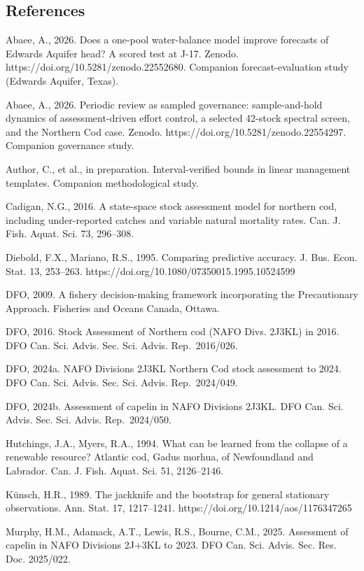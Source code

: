 \documentclass[11pt]{article}
\begin{document}
\subsection{References}\label{references}

Abaee, A., 2026. Does a one-pool water-balance model improve forecasts
of Edwards Aquifer head? A scored test at J-17. Zenodo.
https://doi.org/10.5281/zenodo.22552680. Companion forecast-evaluation
study (Edwards Aquifer, Texas).

Abaee, A., 2026. Periodic review as sampled governance: sample-and-hold
dynamics of assessment-driven effort control, a selected 42-stock
spectral screen, and the Northern Cod case. Zenodo.
https://doi.org/10.5281/zenodo.22554297. Companion governance study.

Author, C., et al., in preparation. Interval-verified bounds in linear
management templates. Companion methodological study.

Cadigan, N.G., 2016. A state-space stock assessment model for northern
cod, including under-reported catches and variable natural mortality
rates. Can. J. Fish. Aquat. Sci. 73, 296--308.

Diebold, F.X., Mariano, R.S., 1995. Comparing predictive accuracy. J.
Bus. Econ. Stat. 13, 253--263.
https://doi.org/10.1080/07350015.1995.10524599

DFO, 2009. A fishery decision-making framework incorporating the
Precautionary Approach. Fisheries and Oceans Canada, Ottawa.

DFO, 2016. Stock Assessment of Northern cod (NAFO Divs. 2J3KL) in 2016.
DFO Can. Sci. Advis. Sec. Sci. Advis. Rep.~2016/026.

DFO, 2024a. NAFO Divisions 2J3KL Northern Cod stock assessment to 2024.
DFO Can. Sci. Advis. Sec. Sci. Advis. Rep.~2024/049.

DFO, 2024b. Assessment of capelin in NAFO Divisions 2J3KL. DFO Can. Sci.
Advis. Sec. Sci. Advis. Rep.~2024/050.

Hutchings, J.A., Myers, R.A., 1994. What can be learned from the
collapse of a renewable resource? Atlantic cod, Gadus morhua, of
Newfoundland and Labrador. Can. J. Fish. Aquat. Sci. 51, 2126--2146.

K\"unsch, H.R., 1989. The jackknife and the bootstrap for general
stationary observations. Ann. Stat. 17, 1217--1241.
https://doi.org/10.1214/aos/1176347265

Murphy, H.M., Adamack, A.T., Lewis, R.S., Bourne, C.M., 2025. Assessment
of capelin in NAFO Divisions 2J+3KL to 2023. DFO Can. Sci. Advis. Sec.
Res. Doc. 2025/022.
\end{document}
